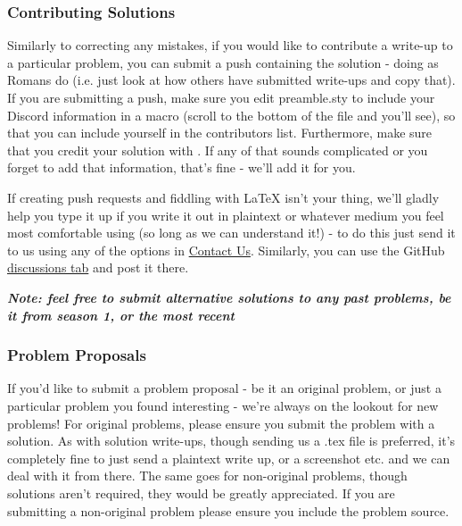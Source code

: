 \subsubsection*{Contributing Solutions}
\label{sec:solutions}

Similarly to correcting any mistakes, if you would like to contribute a write-up to a particular problem, 
you can submit a push containing the solution - doing as Romans do (i.e. just look at how others have submitted write-ups and copy that). 
If you are submitting a push, make sure you edit {\selectfont preamble.sty} to include your Discord information in a macro 
(scroll to the bottom of the file and you'll see), so that you can include yourself in the contributors list. 
Furthermore, make sure that you credit your solution with {\selectfont[Write up by ...]}. 
If any of that sounds complicated or you forget to add that information, that's fine - we'll add it for you.

If creating push requests and fiddling with LaTeX isn't your thing, we'll gladly help you type it up
 if you write it out in plaintext or whatever medium you feel most comfortable using (so long as we can understand it!) - 
 to do this just send it to us using any of the options in \hyperref[sec:contact]{Contact Us}. 
 Similarly, you can use the GitHub \href{https://github.com/OpenPOTD/Solutions/discussions}{discussions tab} and post it there.\medskip 

\textbf{\emph{Note: feel free to submit alternative solutions to any past problems, be it from season 1, or the most recent}}\medskip

\subsubsection*{Problem Proposals}
\label{sec:problems}

If you'd like to submit a problem proposal - be it an original problem, or just a particular problem you found interesting - 
we're always on the lookout for new problems! For original problems, please ensure you submit the problem with a solution. 
As with solution write-ups, though sending us a {\selectfont .tex} file is preferred, it's completely fine to just send a plaintext write up, or a screenshot etc. 
and we can deal with it from there. The same goes for non-original problems, though solutions aren't required, 
they would be greatly appreciated. If you are submitting a non-original problem please ensure you include the problem source. 

